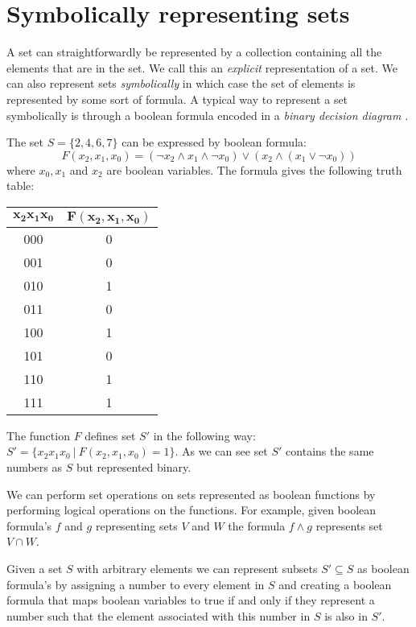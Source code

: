 \section{Symbolically representing sets}
A set can straightforwardly be represented by a collection containing all the elements that are in the set. We call this an \textit{explicit} representation of a set. We can also represent sets \textit{symbolically} in which case the set of elements is represented by some sort of formula. A typical way to represent a set symbolically is through a boolean formula encoded in a \textit{binary decision diagram} \cite{BDD_book,Handbook_BDD_Chapter}. 

\begin{example}
	\label{ex_boolform}
	The set $S = \{ 2,4,6,7 \}$ can be expressed by boolean formula:
	\[ F(x_2,x_1,x_0) = (\neg x_2 \wedge x_1 \wedge \neg x_0) \vee (x_2 \wedge (x_1 \vee \neg x_0)) \]
	where $x_0,x_1$ and $x_2$ are boolean variables. The formula gives the following truth table:\\
	\begin{center}
		\begin{tabular}{|c|c|}
			\hline 
			$\mathbf{x_2x_1x_0}$ & $\mathbf{F(x_2,x_1,x_0)}$ \\ 
			\hline 
			000 & 0 \\ 
			\hline 
			001 & 0 \\ 
			\hline 
			010 & 1 \\ 
			\hline 
			011 & 0 \\ 
			\hline 
			100 & 1 \\ 
			\hline 
			101 & 0 \\ 
			\hline 
			110 & 1 \\ 
			\hline 
			111 & 1 \\ 
			\hline
		\end{tabular} 
	\end{center}
	The function $F$ defines set $S'$ in the following way: $S' = \{x_2x_1x_0\ |\ F(x_2,x_1,x_0) = 1 \}$. As we can see set $S'$ contains the same numbers as $S$ but represented binary.
\end{example}
We can perform set operations on sets represented as boolean functions by performing logical operations on the functions. For example, given boolean formula's $f$ and $g$ representing sets $V$ and $W$ the formula $f \wedge g$ represents set $V \cap W$.

Given a set $S$ with arbitrary elements we can represent subsets $S' \subseteq S$ as boolean formula's by assigning a number to every element in $S$ and creating a boolean formula that maps boolean variables to true if and only if they represent a number such that the element associated with this number in $S$ is also in $S'$.

